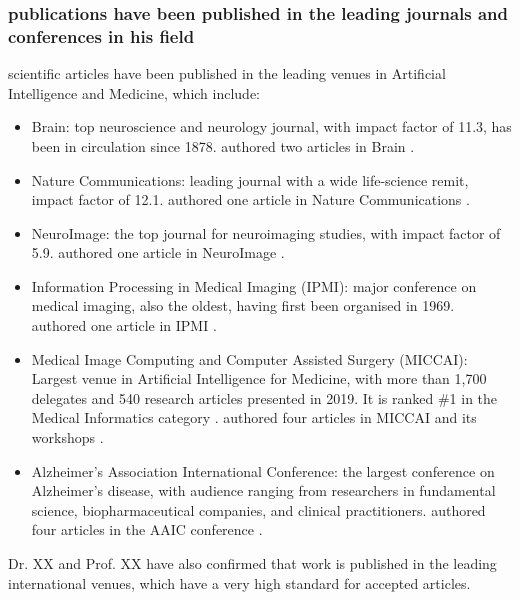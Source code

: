 \documentclass[11pt]{article}
\begin{document}
\subsubsection{\drs publications have been published in the leading journals and conferences in his field}

\drs scientific articles have been published in the leading venues in Artificial Intelligence and Medicine, which include:
\begin{itemize}
    \item Brain: top neuroscience and neurology journal, with impact factor of 11.3, has been in circulation since 1878. \dr authored two articles in Brain \cite{cv}.
    \item Nature Communications: leading journal with a wide life-science remit, impact factor of 12.1. \dr authored one article in Nature Communications \cite{cv}.
    \item NeuroImage: the top journal for neuroimaging studies, with impact factor of 5.9. \dr authored one article in NeuroImage \cite{cv}.
    \item Information Processing in Medical Imaging (IPMI): major conference on medical imaging, also the oldest, having first been organised in 1969. \dr authored one article in IPMI \cite{cv}.    
    \item Medical Image Computing and Computer Assisted Surgery (MICCAI): Largest venue in Artificial Intelligence for Medicine, with more than 1,700 delegates and 540 research articles presented in 2019. It is ranked \#1 in the Medical Informatics category \cite{confrankings}. \dr authored four articles in MICCAI and its workshops \cite{cv}.
    \item Alzheimer's Association International Conference: the largest conference on Alzheimer's disease, with audience ranging from researchers in fundamental science, biopharmaceutical companies, and clinical practitioners. \dr authored four articles in the AAIC conference \cite{cv}.
\end{itemize}

Dr. XX and Prof. XX have also confirmed that \drs work is published in the leading international venues, which have a very high standard for accepted articles.\\

\ty
\end{document}
